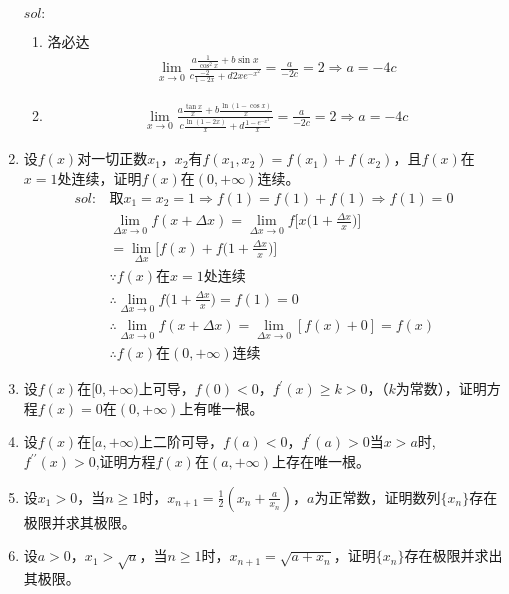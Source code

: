 \begin{enumerate}[{例}1.]
        $sol:$
        \begin{enumerate}[$1^\circ$]
            \item 洛必达
                \begin{align*}
                    \lim_{x \to 0}\frac{a\frac{1}{\cos ^2 x}+b\sin x}{c\frac{-2}{1-2x}+d2xe^{-x^2}}=\frac{a}{-2c}=2\Rightarrow a=-4c
                \end{align*}
            \item
                \begin{align*}
                    \lim_{x \to 0}\frac{a\frac{\tan x}{x}+b\frac{\ln(1-\cos x)}{x}}{c\frac{\ln(1-2x)}{x}+d\frac{1-e^{-x^2}}{x}}=\frac{a}{-2c}=2\Rightarrow a=-4c
                \end{align*}
        \end{enumerate}
    \item 设$f(x)$对一切正数$x_1$，$x_2$有$f(x_1,x_2)=f(x_1)+f(x_2)$，且$f(x)$在$x=1$处连续，证明$f(x)$在$(0,+\infty)$连续。
        \begin{align*}
            sol:&\mbox{取}x_1 = x_2 =1\Rightarrow f(1)=f(1)+f(1)\Rightarrow f(1)=0\\
                &\lim_{\Delta x\to 0}f(x+\Delta x)=\lim_{\Delta x\to 0}f\bigg[x\Big(1+\frac{\Delta x}{x}\Big)\bigg]\\
                &=\lim_{\Delta x}\bigg[f(x)+f\Big(1+\frac{\Delta x}{x}\Big)\bigg]\\
                &\because f(x)\mbox{在}x=1\mbox{处连续}\\
                &\therefore \lim_{\Delta x\to 0}f\Big(1+\frac{\Delta x}{x}\Big)=f(1)=0\\
                &\therefore \lim_{\Delta x\to 0}f(x+\Delta x)=\lim_{\Delta x\to 0}[f(x)+0]=f(x)\\
                &\therefore f(x)\mbox{在}(0,+\infty)\mbox{连续}
        \end{align*}
    \item 设$f(x)$在$[0,+\infty)$上可导，$f(0)<0$，$f^{\prime}(x)\geq k>0$，（$k$为常数），证明方程$f(x)=0$在$(0,+\infty)$上有唯一根。
    \item 设$f(x)$在$[a,+\infty)$上二阶可导，$f(a)<0$，$f^\prime(a)>0$当$x>a$时,$f^{\prime\prime}(x)>0$,证明方程$f(x)$在$(a,+\infty)$上存在唯一根。
    \item 设$x_1>0$，当$n\geq1$时，$x_{n+1}=\frac{1}{2}(x_n+\frac{a}{x_n})$，$a$为正常数，证明数列$\{x_n\}$存在极限并求其极限。
    \item 设$a>0$，$x_1>\sqrt{a}$，当$n\geq1$时，$x_{n+1}=\sqrt{a+x_n}$，证明$\{x_n\}$存在极限并求出其极限。

\end{enumerate}
